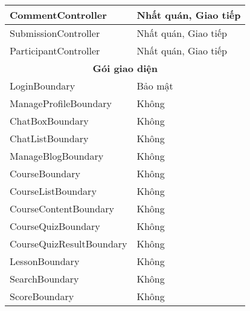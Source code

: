 \documentclass[./../main_file.tex]{subfiles}
\begin{document}
\begin{longtable}{|p{}|p{}|}
			CommentController                     & Nhất quán, Giao tiếp                                          \\ \hline
			SubmissionController                  & Nhất quán, Giao tiếp                                          \\ \hline
			ParticipantController                 & Nhất quán, Giao tiếp                                          \\ \hline
			\multicolumn{2}{|c|}{\textbf{Gói giao diện}}                                                          \\ \hline
			LoginBoundary                         & Bảo mật                                                       \\ \hline
			ManageProfileBoundary                 & Không                                                         \\ \hline
			ChatBoxBoundary                       & Không                                                         \\ \hline
			ChatListBoundary                      & Không                                                         \\ \hline
			ManageBlogBoundary                    & Không                                                         \\ \hline
			CourseBoundary                        & Không                                                         \\ \hline
			CourseListBoundary                    & Không                                                         \\ \hline
			CourseContentBoundary                 & Không                                                         \\ \hline
			CourseQuizBoundary                    & Không                                                         \\ \hline
			CourseQuizResultBoundary              & Không                                                         \\ \hline
			LessonBoundary                        & Không                                                         \\ \hline
			SearchBoundary                        & Không                                                         \\ \hline
			ScoreBoundary                         & Không                                                         \\ \hline

\end{longtable}
\end{document}

